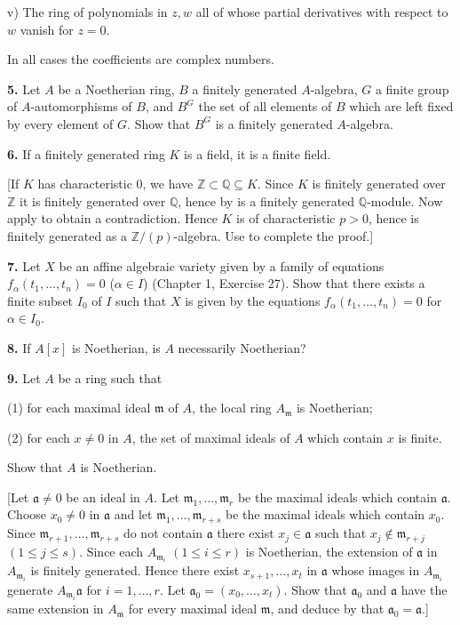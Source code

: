 v) The ring of polynomials in $z,w$ all of whose partial derivatives with respect
to $w$ vanish for $z=0$.

In all cases the coefficients are complex numbers.

\medskip
\noindent\textbf{5.} Let $A$ be a Noetherian ring, $B$ a finitely generated $A$-algebra, $G$ a finite group of
$A$-automorphisms of $B$, and $B^G$ the set of all elements of $B$ which are left fixed
by every element of $G$.  Show that $B^G$ is a finitely generated $A$-algebra.

\medskip
\noindent\textbf{6.} If a finitely generated ring $K$ is a field, it is a finite field.

[If $K$ has characteristic 0, we have $\mathbb Z\subset\mathbb Q\subseteq K$.  Since $K$ is finitely generated
over $\mathbb Z$ it is finitely generated over $\mathbb Q$, hence by  is a finitely generated $\mathbb Q$-module.  Now apply  to obtain a contradiction.  Hence $K$ is of characteristic
$p>0$, hence is finitely generated as a $\mathbb Z/(p)$-algebra.  Use  to complete the
proof.]

\medskip
\noindent\textbf{7.} Let $X$ be an affine algebraic variety given by a family of equations $f_\alpha(t_1,\ldots,t_n)
=0$ ($\alpha\in I$) (Chapter 1, Exercise 27).  Show that there exists a finite subset $I_0$ of $I$
such that $X$ is given by the equations $f_\alpha(t_1,\ldots,t_n)=0$ for $\alpha\in I_0$.

\medskip
\noindent\textbf{8.} If $A[x]$ is Noetherian, is $A$ necessarily Noetherian?

\medskip
\noindent\textbf{9.} Let $A$ be a ring such that

(1) for each maximal ideal $\mathfrak m$ of $A$, the local ring $A_\mathfrak m$ is Noetherian;

(2) for each $x\ne0$ in $A$, the set of maximal ideals of $A$ which contain $x$ is
finite.

Show that $A$ is Noetherian.

[Let $\mathfrak a\ne0$ be an ideal in $A$.  Let $\mathfrak m_1,\ldots,\mathfrak m_r$ be the maximal ideals which
contain $\mathfrak a$.  Choose $x_0\ne0$ in $\mathfrak a$ and let $\mathfrak m_1,\ldots,\mathfrak m_{r+s}$ be the maximal ideals
which contain $x_0$.  Since $\mathfrak m_{r+1},\ldots,\mathfrak m_{r+s}$ do not contain $\mathfrak a$ there exist $x_j\in\mathfrak a$ such
that $x_j\notin\mathfrak m_{r+j}$ $(1\leq j\leq s)$.  Since each $A_{\mathfrak m_i}$ $(1\leq i\leq r)$ is Noetherian, the extension of $\mathfrak a$ in $A_{\mathfrak m_i}$ is finitely generated.  Hence there exist $x_{s+1},\ldots,x_t$ in $\mathfrak a$
whose images in $A_{\mathfrak m_i}$ generate $A_{\mathfrak m_i}\mathfrak a$ for $i=1,\ldots,r$.  Let $\mathfrak a_0=(x_0,\ldots,x_t)$.
Show that $\mathfrak a_0$ and $\mathfrak a$ have the same extension in $A_\mathfrak m$ for every maximal ideal $\mathfrak m$, and
deduce by  that $\mathfrak a_0=\mathfrak a$.]


